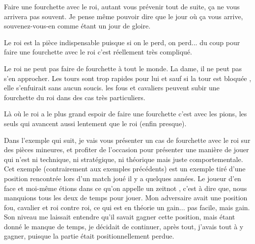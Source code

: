 \documentclass[a5paper,openany,twocolumn]{book}
\begin{document}
Faire une fourchette avec le roi, autant vous prévenir tout de suite, ça ne vous arrivera pas souvent. Je pense même pouvoir dire que le jour où ça vous arrive, souvenez-vous-en comme étant un jour de gloire.

Le roi est la pièce indispensable puisque si on le perd, on perd... du coup pour faire une fourchette avec le roi c'est réellement très compliqué.

Le roi ne peut pas faire de fourchette à tout le monde. La dame, il ne peut pas s'en approcher. Les tours sont trop rapides pour lui et sauf si la tour est \og bloquée \fg, elle s'enfuirait sans aucun soucis. les fous et cavaliers peuvent subir une fourchette du roi dans des cas très particuliers. 

Là où le roi a le plus grand espoir de faire une fourchette c'est avec les pions, les seuls qui avancent aussi lentement que le roi (enfin presque).

Dans l'exemple qui suit, je vais vous présenter un cas de fourchette avec le roi sur des pièces mineures, et profiter de l'occasion pour présenter une manière de jouer qui n'est ni technique, ni stratégique, ni théorique mais juste comportementale. Cet exemple (contrairement aux exemples précédents) est un exemple tiré d'une position rencontrée lors d'un match joué il y a quelques années. Le joueur d'en face et moi-même étions dans ce qu'on appelle un \og zeitnot \fg, c'est à dire que, nous manquions tous les deux de temps pour jouer. Mon adversaire avait une position fou, cavalier et roi contre roi, ce qui est en théorie un gain... pas facile, mais gain. Son niveau me laissait entendre qu'il savait gagner cette position, mais étant donné le manque de temps, je décidait de continuer, après tout, j'avais tout à y gagner, puisque la partie était positionnellement perdue.
\end{document}
